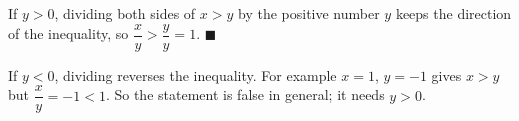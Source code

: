 If $y>0$, dividing both sides of $x>y$ by the positive number $y$ keeps the direction of the inequality, so $\dfrac {x}{y}>\dfrac {y}{y}=1$. $\blacksquare$

If $y<0$, dividing reverses the inequality. For example $x=1$, $y=-1$ gives $x>y$ but $\dfrac {x}{y}=-1<1$. So the statement is false in general; it needs $y>0$.
